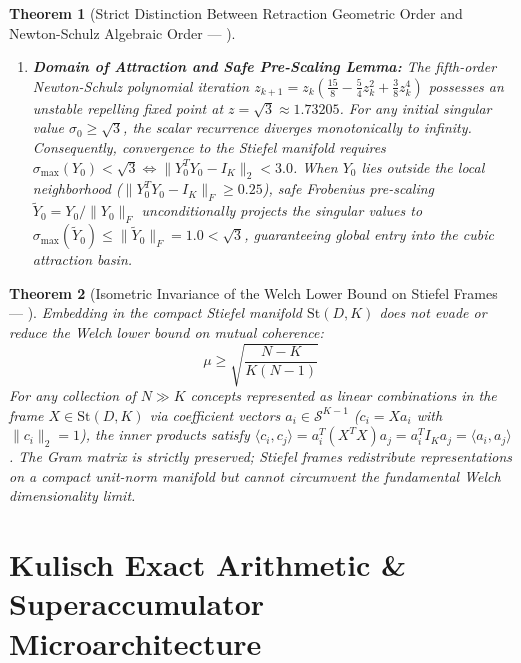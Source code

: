 \documentclass[journal,10pt,compsoc]{IEEEtran}
\theoremstyle{plain}
\newtheorem{theorem}{Theorem}
\theoremstyle{definition}
\begin{document}
\begin{theorem}[Strict Distinction Between Retraction Geometric Order and Newton-Schulz Algebraic Order --- \label{thm:polydim_0400}]
\begin{enumerate}
    \item \textbf{Domain of Attraction and Safe Pre-Scaling Lemma:} The fifth-order Newton-Schulz polynomial iteration $z_{k+1} = z_k (\frac{15}{8} - \frac{5}{4}z_k^2 + \frac{3}{8}z_k^4)$ possesses an unstable repelling fixed point at $z = \sqrt{3} \approx 1.73205$. For any initial singular value $\sigma_0 \ge \sqrt{3}$, the scalar recurrence diverges monotonically to infinity. Consequently, convergence to the Stiefel manifold requires $\sigma_{\max}(Y_0) < \sqrt{3} \iff \|Y_0^T Y_0 - I_K\|_2 < 3.0$. When $Y_0$ lies outside the local neighborhood ($\|Y_0^T Y_0 - I_K\|_F \ge 0.25$), safe Frobenius pre-scaling $\tilde{Y}_0 = Y_0 / \|Y_0\|_F$ unconditionally projects the singular values to $\sigma_{\max}(\tilde{Y}_0) \le \|\tilde{Y}_0\|_F = 1.0 < \sqrt{3}$, guaranteeing global entry into the cubic attraction basin.
\end{enumerate}
\end{theorem}

\begin{theorem}[Isometric Invariance of the Welch Lower Bound on Stiefel Frames --- \label{thm:polydim_0500}]
Embedding in the compact Stiefel manifold $\mathrm{St}(D, K)$ does not evade or reduce the Welch lower bound on mutual coherence:
\begin{equation}
\label{eq:welch_bound_dissertation}
\mu \ge \sqrt{\frac{N - K}{K(N - 1)}}
\end{equation}
For any collection of $N \gg K$ concepts represented as linear combinations in the frame $X \in \mathrm{St}(D, K)$ via coefficient vectors $a_i \in \mathcal{S}^{K-1}$ ($c_i = X a_i$ with $\|c_i\|_2 = 1$), the inner products satisfy $\langle c_i, c_j \rangle = a_i^T (X^T X) a_j = a_i^T I_K a_j = \langle a_i, a_j \rangle$. The Gram matrix is strictly preserved; Stiefel frames redistribute representations on a compact unit-norm manifold but cannot circumvent the fundamental Welch dimensionality limit.
\end{theorem}

\section{Kulisch Exact Arithmetic \& Superaccumulator Microarchitecture}
\label{sec:kulisch}
\end{document}
